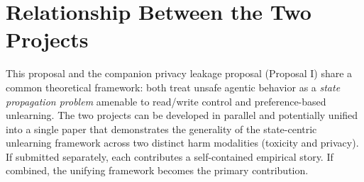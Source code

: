 \documentclass[11pt]{article}
\begin{document}
\section{Relationship Between the Two Projects}

This proposal and the companion privacy leakage proposal (Proposal I) share a common
theoretical framework: both treat unsafe agentic behavior as a \emph{state propagation
problem} amenable to read/write control and preference-based unlearning. The two projects
can be developed in parallel and potentially unified into a single paper that demonstrates
the generality of the state-centric unlearning framework across two distinct harm modalities
(toxicity and privacy). If submitted separately, each contributes a self-contained
empirical story. If combined, the unifying framework becomes the primary contribution.
\end{document}
